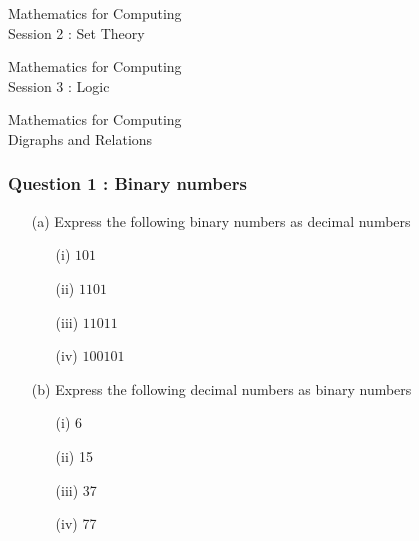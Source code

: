 \documentclass[]{report}
\begin{document}
	
	\newpage
	\begin{center}
		\huge{Mathematics for Computing}\\
		{\LARGE Session 2 : Set Theory}
	\end{center}
	
	

	\newpage
	\begin{center}
		\huge{Mathematics for Computing}\\
		{\LARGE Session 3 : Logic}
	\end{center}
	
	\newpage
	\begin{center}
		\huge{Mathematics for Computing}\\
		\LARGE{Digraphs and Relations}
	\end{center}
	
	
	\subsubsection*{Question 1 : Binary numbers}
	\begin{itemize}
		\item[(a)] Express the following binary numbers as decimal numbers
		\begin{multicols}{2}
			\begin{itemize}
				\item[(i)] $101$
				\item[(ii)] $1101$
				\item[(iii)] $11011$
				\item[(iv)] $100101$
			\end{itemize}
		\end{multicols}
		
		\item[(b)] Express the following decimal numbers as binary numbers
		\begin{multicols}{2}
			\begin{itemize}
				\item[(i)] 6
				\item[(ii)] 15
				\item[(iii)] 37
				\item[(iv)] 77
			\end{itemize}
		\end{multicols}
		
	\end{itemize}
\end{document}
